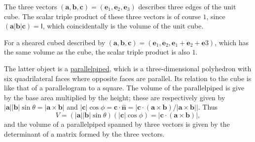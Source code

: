 \documentclass[10pt,notitlepage]{revtex4-1}
\newenvironment{example}[1][Example]{\begin{trivlist}
\item[\hskip \labelsep {\bfseries #1}]}{\end{trivlist}}
\newcommand{\eb}{\boldsymbol{e}}
\newcommand{\ab}{{\boldsymbol{a}}}
\newcommand{\bb}{{\boldsymbol{b}}}
\newcommand{\cb}{{\boldsymbol{c}}}
\newcommand{\nb}{{\boldsymbol{n}}}
\begin{document}
\begin{example}
	The three vectors $(\ab,\bb,\cb)=(\eb_1,\eb_2,\eb_3)$ describes three edges
	of the unit cube. The scalar triple product of these three vectors is of
	course $1$, since $(\ab|\bb|\cb)=\mathsf{I}$, which coincidentally is the
	volume of the unit cube.
	
	For a sheared cubed described by
	$(\ab,\bb,\cb)=(\eb_1,\eb_2,\eb_1+\eb_2+\eb3)$, which has the same volume as
	the cube, the scalar triple product is also $1$.
\end{example}

The latter object is a \underline{parallelpiped}, which is a three-dimensional
polyhedron with six quadrilateral faces where opposite faces are parallel. Its
relation to the cube is like that of a parallelogram to a square. The volume of
the parallelpiped is give by the base area multiplied by the height; these are
respectively given by $|\ab||\bb|\sin\theta=|\ab\times\bb|$ and
$|\cb|\cos\phi=\cb\cdot\hat{\nb}=|\cb\cdot(\ab\times\bb)/|\ab\times\bb||$. Thus
\begin{equation}
	V=(|\ab||\bb|\sin\theta)(|\cb|\cos\phi)=|\cb\cdot(\ab\times\bb)|,
\end{equation}
and the volume of a parallelpiped spanned by three vectors is given by the
determinant of a matrix formed by the three vectors.
\end{document}
